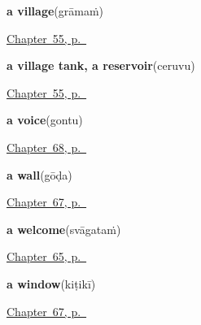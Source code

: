 \noindent\begin{minipage}[t]{\linewidth}
\raggedright
\textbf{a village}\enspace\emph{}\enspace(grāmaṁ)\par
\footnotesize \hyperref[ch:te-river-road]{Chapter~55, p.~\pageref*{ch:te-river-road}}
\end{minipage}\par\smallskip

\noindent\begin{minipage}[t]{\linewidth}
\raggedright
\textbf{a village tank, a reservoir}\enspace\emph{}\enspace(ceruvu)\par
\footnotesize \hyperref[ch:te-river-road]{Chapter~55, p.~\pageref*{ch:te-river-road}}
\end{minipage}\par\smallskip

\noindent\begin{minipage}[t]{\linewidth}
\raggedright
\textbf{a voice}\enspace\emph{}\enspace(gontu)\par
\footnotesize \hyperref[ch:te-sound-and-voice]{Chapter~68, p.~\pageref*{ch:te-sound-and-voice}}
\end{minipage}\par\smallskip

\noindent\begin{minipage}[t]{\linewidth}
\raggedright
\textbf{a wall}\enspace\emph{}\enspace(gōḍa)\par
\footnotesize \hyperref[ch:te-the-house-itself]{Chapter~67, p.~\pageref*{ch:te-the-house-itself}}
\end{minipage}\par\smallskip

\noindent\begin{minipage}[t]{\linewidth}
\raggedright
\textbf{a welcome}\enspace\emph{}\enspace(svāgataṁ)\par
\footnotesize \hyperref[ch:te-more-manners]{Chapter~65, p.~\pageref*{ch:te-more-manners}}
\end{minipage}\par\smallskip

\noindent\begin{minipage}[t]{\linewidth}
\raggedright
\textbf{a window}\enspace\emph{}\enspace(kiṭikī)\par
\footnotesize \hyperref[ch:te-the-house-itself]{Chapter~67, p.~\pageref*{ch:te-the-house-itself}}
\end{minipage}\par\smallskip

